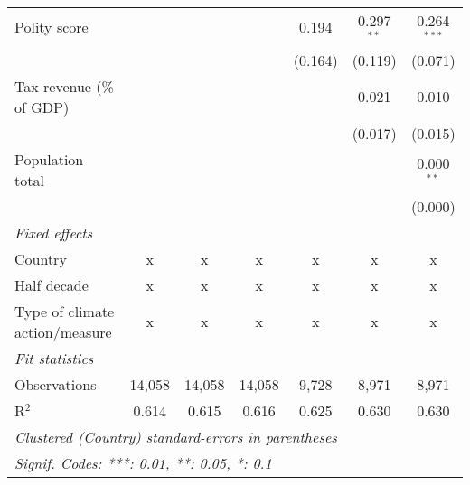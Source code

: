 \begin{tabular}{lcccccc}
   Polity score                                                    &         &                &                & 0.194          & 0.297$^{**}$   & 0.264$^{***}$\\   
                                                                   &         &                &                & (0.164)        & (0.119)        & (0.071)\\   
   Tax revenue (\% of GDP)                                         &         &                &                &                & 0.021          & 0.010\\   
                                                                   &         &                &                &                & (0.017)        & (0.015)\\   
   Population total                                                &         &                &                &                &                & 0.000$^{**}$\\   
                                                                   &         &                &                &                &                & (0.000)\\   
   \emph{Fixed effects}\\
   Country                                                         & x       & x              & x              & x              & x              & x\\  
   Half decade                                                     & x       & x              & x              & x              & x              & x\\  
   Type of climate action/measure                                  & x       & x              & x              & x              & x              & x\\  
   \midrule \emph{Fit statistics}\\
   Observations                                                    & 14,058  & 14,058         & 14,058         & 9,728          & 8,971          & 8,971\\  
   R$^2$                                                           & 0.614   & 0.615          & 0.616          & 0.625          & 0.630          & 0.630\\  
   \midrule
   \multicolumn{7}{l}{\emph{Clustered (Country) standard-errors in parentheses}}\\
   \multicolumn{7}{l}{\emph{Signif. Codes: ***: 0.01, **: 0.05, *: 0.1}}\\
\end{tabular}
\par\endgroup


